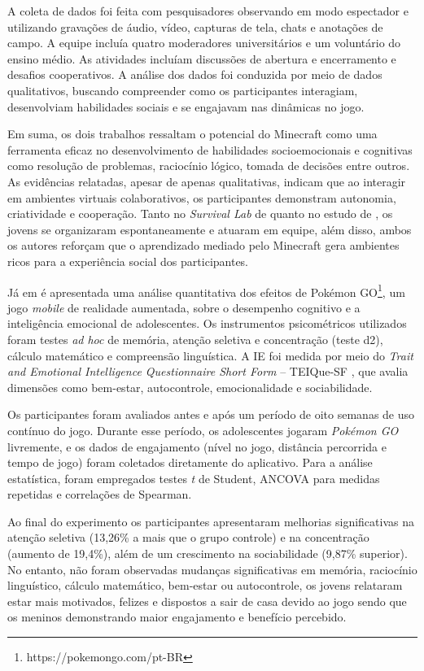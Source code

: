 A coleta de dados foi feita com pesquisadores observando em modo espectador e utilizando gravações de áudio, vídeo, capturas de tela, chats e anotações de campo. A equipe incluía quatro moderadores universitários e um voluntário do ensino médio. As atividades incluíam  discussões de abertura e encerramento e desafios cooperativos. A análise dos dados foi conduzida por meio de dados qualitativos, buscando compreender como os participantes interagiam, desenvolviam habilidades sociais e se engajavam nas dinâmicas no jogo.

Em suma, os dois trabalhos ressaltam o potencial do Minecraft como uma ferramenta eficaz no desenvolvimento de habilidades socioemocionais e cognitivas como resolução de problemas, raciocínio lógico, tomada de decisões entre outros. As evidências relatadas, apesar de apenas qualitativas, indicam que ao interagir em ambientes virtuais colaborativos, os participantes demonstram autonomia, criatividade e cooperação. Tanto no \textit{Survival Lab} de \cite{Jagannath2020} quanto no estudo de \cite{Hewett2020}, os jovens se organizaram espontaneamente e atuaram em equipe, além disso, ambos os autores reforçam que o aprendizado mediado pelo Minecraft gera ambientes ricos para a experiência social dos participantes.


Já em  é apresentada uma análise quantitativa dos efeitos de Pokémon GO\footnote{https://pokemongo.com/pt-BR}, um jogo \textit{mobile} de realidade aumentada, sobre o desempenho cognitivo e a inteligência emocional de adolescentes. Os instrumentos psicométricos utilizados foram testes \textit{ad hoc} de memória, atenção seletiva e concentração (teste d2), cálculo matemático e compreensão linguística. A IE foi medida por meio do \textit{Trait and Emotional Intelligence Questionnaire Short Form} -- TEIQue-SF \cite{petrides2009teique}, que avalia dimensões como bem-estar, autocontrole, emocionalidade e sociabilidade.

Os participantes foram avaliados antes e após um período de oito semanas de uso contínuo do jogo. Durante esse período, os adolescentes jogaram \textit{Pokémon GO} livremente, e os dados de engajamento (nível no jogo, distância percorrida e tempo de jogo) foram coletados diretamente do aplicativo. Para a análise estatística, foram empregados testes \textit{t} de Student, ANCOVA para medidas repetidas e correlações de Spearman.

Ao final do experimento os participantes apresentaram melhorias significativas na atenção seletiva (13,26\% a mais que o grupo controle) e na concentração (aumento de 19,4\%), além de um crescimento na sociabilidade (9,87\% superior). No entanto, não foram observadas mudanças significativas em memória, raciocínio linguístico, cálculo matemático, bem-estar ou autocontrole, os jovens relataram estar mais motivados, felizes e dispostos a sair de casa devido ao jogo sendo que os meninos demonstrando maior engajamento e benefício percebido.

